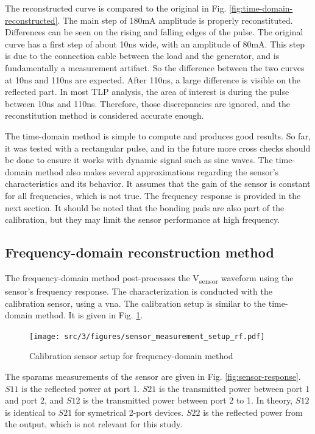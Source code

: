 The reconstructed curve is compared to the original in Fig. \ref{fig:time-domain-reconstructed}.
The main step of 180mA amplitude is properly reconstituted.
Differences can be seen on the rising and falling edges of the pulse.
The original curve has a first step of about 10ns wide, with an amplitude of 80mA.
This step is due to the connection cable between the load and the generator, and is fundamentally a measurement artifact.
So the difference between the two curves at 10ns and 110ns are expected.
After 110ns, a large difference is visible on the reflected part.
In most TLP analysis, the area of interest is during the pulse between 10ns and 110ns.
Therefore, those discrepancies are ignored, and the reconstitution method is considered accurate enough.

The time-domain method is simple to compute and produces good results.
So far, it was tested with a rectangular pulse, and in the future more cross checks should be done to ensure it works with dynamic signal such as sine waves.
The time-domain method also makes several approximations regarding the sensor's characteristics and its behavior.
It assumes that the gain of the sensor is constant for all frequencies, which is not true.
The frequency response is provided in the next section.
It should be noted that the bonding pads are also part of the calibration, but they may limit the sensor performance at high frequency.

\subsection{Frequency-domain reconstruction method}

The frequency-domain method post-processes the V\textsubscript{sensor} waveform using the sensor's frequency response.
The characterization is conducted with the calibration sensor, using a \gls{vna}.
The calibration setup is similar to the time-domain method.
It is given in Fig. \ref{fig:calibration-sensor-rf}.

\begin{figure}[!h]
  \centering
  \texttt{[image: src/3/figures/sensor\_measurement\_setup\_rf.pdf]}
  \caption{Calibration sensor setup for frequency-domain method}
  \label{fig:calibration-sensor-rf}
\end{figure}

The \gls{sparams} measurements of the sensor are given in Fig. \ref{fig:sensor-response}.
$S11$ is the reflected power at port 1.
$S21$ is the transmitted power between port 1 and port 2, and $S12$ is the transmitted power between port 2 to 1.
In theory, $S12$ is identical to $S21$ for symetrical 2-port devices.
$S22$ is the reflected power from the output, which is not relevant for this study.

